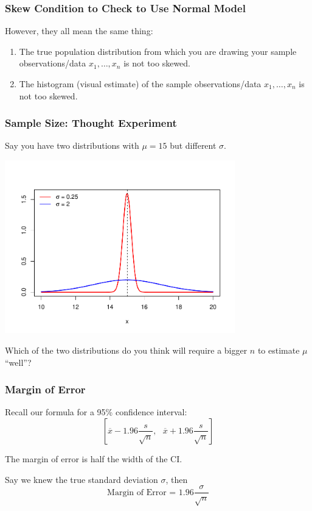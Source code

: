 \documentclass[handout]{beamer}
\newcommand{\blue}[1]{\textcolor{blue2}{#1}}
\begin{document}
\begin{frame}
\frametitle{Skew Condition to Check to Use Normal Model}
However, they all mean the same thing:

\begin{enumerate}
\pause\item The \blue{true population} distribution from which you are drawing your sample observations/data $x_1, \ldots, x_n$ is not too skewed.  
\pause\item The histogram (visual estimate) of the sample observations/data $x_1, \ldots, x_n$ is not too skewed.  
\end{enumerate}

\end{frame}


\begin{frame}
\frametitle{Sample Size:  Thought Experiment}
Say you have two distributions with $\mu=15$ but different $\sigma$.
\begin{center}
\includegraphics[width=0.75\textwidth]{figure/norm.pdf}
\end{center}
\pause Which of the two distributions do you think will require a bigger $n$ to estimate $\mu$ ``well''?
\end{frame}


\begin{frame}
\frametitle{Margin of Error}
Recall our formula for a 95\% confidence interval:
\[\left[
\overline{x} - 1.96 \frac{s}{\sqrt n}, \mbox{  }
\overline{x} + 1.96 \frac{s}{\sqrt n}
\right]\]

\pause The \blue{margin of error} is half the width of the CI.\\

\vspace{0.25cm}

\pause Say we knew the \blue{true} standard deviation $\sigma$, then
\[
\mbox{Margin of Error = } 1.96 \frac{\sigma}{\sqrt n} 
\]
\end{frame}
\end{document}
